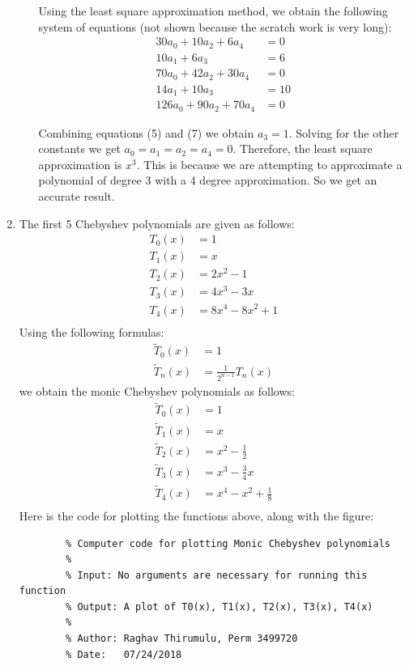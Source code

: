 \documentclass{article}
\begin{document}
\begin{enumerate}
\begin{enumerate}
            Using the least square approximation method, we obtain the following system of equations (not shown because the scratch work is very long):
            \begin{align}
                30a_0 + 10a_2 + 6a_4 &= 0 \\
                10a_1 + 6a_3 &= 6 \\
                70a_0 + 42a_2 + 30a_4 &= 0 \\
                14a_1 + 10a_3 &= 10 \\
                126a_0 + 90a_2 + 70a_4 &= 0
            \end{align}
            
            Combining equations (5) and (7) we obtain $ a_3 = 1$. Solving for the other constants we get $ a_0 = a_1 = a_2 = a_4 = 0$. Therefore, the least square approximation is $x^3$. This is because we are attempting to approximate a polynomial of degree 3 with a 4 degree approximation. So we get an accurate result. 
        \end{enumerate}
    \item %
        The first 5 Chebyshev polynomials are given as follows: 
        \begin{align*}
        T_0(x) &= 1 \\
        T_1(x) &= x \\
        T_2(x) &= 2x^2-1 \\
        T_3(x) &= 4x^3-3x \\
        T_4(x) &= 8x^4-8x^2+1 \\
        \end{align*}
        Using the following formulas:
        \begin{align*}
            \widetilde{T}_0(x) &= 1 \\
            \widetilde{T}_n(x) &= \frac{1}{2^{n-1}}T_n(x)
        \end{align*}
        we obtain the monic Chebyshev polynomials as follows:
        \begin{align*}
        \widetilde{T}_0(x) &= 1 \\
        \widetilde{T}_1(x) &= x \\
        \widetilde{T}_2(x) &= x^2-\frac{1}{2} \\
        \widetilde{T}_3(x) &= x^3-\frac{3}{4}x \\
        \widetilde{T}_4(x) &= x^4-x^2+\frac{1}{8} \\
        \end{align*}
        Here is the code for plotting the functions above, along with the figure:
        \begin{lstlisting}
        % Computer code for plotting Monic Chebyshev polynomials
        %
        % Input: No arguments are necessary for running this function
        % Output: A plot of T0(x), T1(x), T2(x), T3(x), T4(x)
        %
        % Author: Raghav Thirumulu, Perm 3499720
        % Date:   07/24/2018


\end{lstlisting}
\end{enumerate}
\end{document}
